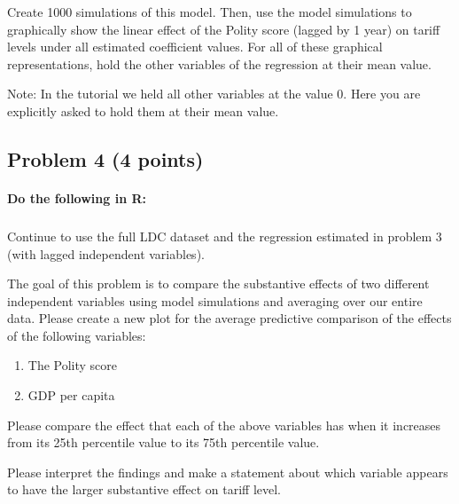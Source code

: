 \documentclass[12pt]{article}
\begin{document}
\bigskip

Create 1000 simulations of this model. Then, use the model simulations to graphically show the linear effect of the Polity score (lagged by 1 year) on tariff levels under all estimated coefficient values. For all of these graphical representations, hold the other variables of the regression at their mean value.

\bigskip

Note: In the tutorial we held all other variables at the value 0. Here you are explicitly asked to hold them at their mean value.


\pagebreak

\subsection*{Problem 4 (4 points)}

\paragraph{Do the following in R:}

\subparagraph{} Continue to use the full LDC dataset and the regression estimated in problem 3 (with lagged independent variables).

The goal of this problem is to compare the substantive effects of two different independent variables using model simulations and averaging over our entire data. Please create a new plot for the average predictive comparison of the effects of the following variables:

\begin{enumerate}
	\item The Polity score
	\item GDP per capita
\end{enumerate}

Please compare the effect that each of the above variables has when it increases from its 25th percentile value to its 75th percentile value.

Please interpret the findings and make a statement about which variable appears to have the larger substantive effect on tariff level.
\end{document}
